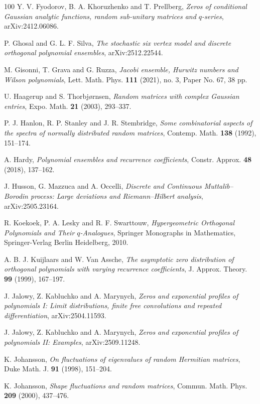 \documentclass{amsart}
\theoremstyle{plain}
\theoremstyle{remark}
\numberwithin{equation}{section}
\begin{document}
\begin{thebibliography}{100}
 Y. V. Fyodorov, B. A. Khoruzhenko and T. Prellberg, \emph{Zeros of conditional Gaussian analytic functions, random sub-unitary matrices and $q$-series}, arXiv:2412.06086. 

 P. Ghosal and G. L. F. Silva, \emph{The stochastic six vertex model and discrete orthogonal polynomial ensembles}, arXiv:2512.22544. 

 M. Gisonni, T. Grava and G. Ruzza, \emph{Jacobi ensemble, Hurwitz numbers and Wilson polynomials}, Lett. Math. Phys. \textbf{111} (2021), no. 3, Paper No. 67, 38 pp. 

 U. Haagerup and S. Thorbjørnsen, \emph{Random matrices with complex Gaussian entries}, Expo. Math. \textbf{21} (2003), 293--337.

 P. J. Hanlon, R. P. Stanley and J. R. Stembridge, \emph{Some combinatorial aspects of the spectra of normally distributed random matrices}, Contemp. Math. \textbf{138} (1992), 151--174.

 A. Hardy, \emph{Polynomial ensembles and recurrence coefficients}, Constr. Approx. \textbf{48} (2018), 137--162. 

 J. Husson, G. Mazzuca and A. Occelli, \emph{Discrete and Continuous Muttalib–Borodin process: Large deviations and Riemann–Hilbert analysis}, arXiv:2505.23164. 

 R. Koekoek, P. A. Lesky and R. F. Swarttouw, \emph{Hypergeometric Orthogonal Polynomials and Their $q$-Analogues}, Springer Monographs in Mathematics, Springer-Verlag Berlin Heidelberg, 2010.  

 A. B. J. Kuijlaars and W. Van Assche, \emph{The asymptotic zero distribution of orthogonal polynomials with varying recurrence coefficients}, J. Approx. Theory. \textbf{99} (1999), 167--197.

 J. Jalowy, Z. Kabluchko and A. Marynych, \emph{Zeros and exponential profiles of polynomials I: Limit distributions, finite free convolutions and repeated differentiation}, arXiv:2504.11593.

 J. Jalowy, Z. Kabluchko and A. Marynych, \emph{Zeros and exponential profiles of polynomials II: Examples}, arXiv:2509.11248. 

 K. Johansson, \emph{On fluctuations of eigenvalues of random Hermitian matrices}, Duke Math. J. \textbf{91} (1998), 151--204.

 K. Johansson, \emph{Shape fluctuations and random matrices}, Commun. Math. Phys. \textbf{209} (2000), 437--476.


\end{thebibliography}
\end{document}
